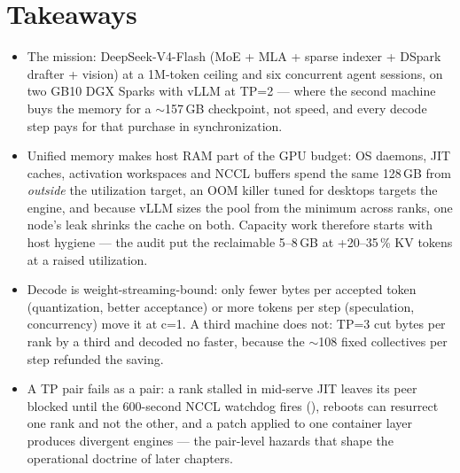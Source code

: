 \section*{Takeaways}
\begin{itemize}
  \item The mission: DeepSeek-V4-Flash (MoE + MLA + sparse indexer + DSpark
    drafter + vision) at a 1M-token ceiling and six concurrent agent
    sessions, on two GB10 DGX Sparks with vLLM at TP=2 --- where the second
    machine buys the memory for a $\sim$157\,GB checkpoint, not speed, and
    every decode step pays for that purchase in synchronization.
  \item Unified memory makes host RAM part of the GPU budget: OS daemons,
    JIT caches, activation workspaces and NCCL buffers spend the same
    128\,GB from \emph{outside} the utilization target, an OOM killer tuned
    for desktops targets the engine, and because vLLM sizes the pool from
    the minimum across ranks, one node's leak shrinks the cache on both.
    Capacity work therefore starts with host hygiene --- the audit put the
    reclaimable 5--8\,GB at +20--35\,\% KV tokens at a raised utilization.
  \item Decode is weight-streaming-bound: only fewer bytes per accepted
    token (quantization, better acceptance) or more tokens per step
    (speculation, concurrency) move it at c=1. A third machine does not:
    TP=3 cut bytes per rank by a third and decoded no faster, because the
    $\sim$108 fixed collectives per step refunded the saving.
  \item A TP pair fails as a pair: a rank stalled in mid-serve JIT leaves
    its peer blocked until the 600-second NCCL watchdog fires
    (), reboots can resurrect one rank and not the other, and
    a patch applied to one container layer produces divergent engines ---
    the pair-level hazards that shape the operational doctrine of later
    chapters.
\end{itemize}

